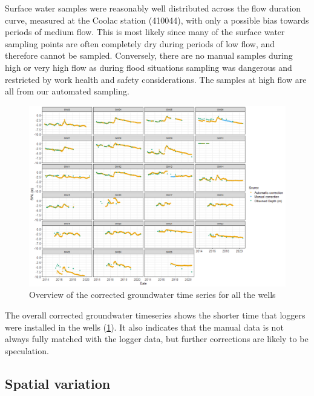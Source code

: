 \documentclass[, manuscript]{copernicus}
\begin{document}
\clearpage

Surface water samples were reasonably well distributed across the flow
duration curve, measured at the Coolac station (410044), with only a
possible bias towards periods of medium flow. This is most likely since
many of the surface water sampling points are often completely dry
during periods of low flow, and therefore cannot be sampled. Conversely,
there are no manual samples during high or very high flow as during
flood situations sampling was dangerous and restricted by work health
and safety considerations. The samples at high flow are all from our
automated sampling.

\begin{figure}
\includegraphics[width=1\linewidth]{Figures/Final_Corrected_piezodepths} \caption{Overview of the corrected groundwater time series for all the wells}\label{fig:gw-series}
\end{figure}

\clearpage

The overall corrected groundwater timeseries shows the shorter time that
loggers were installed in the wells (\ref{fig:gw-series}). It also
indicates that the manual data is not always fully matched with the
logger data, but further corrections are likely to be speculation.

\subsection{Spatial variation}

\clearpage
\end{document}

